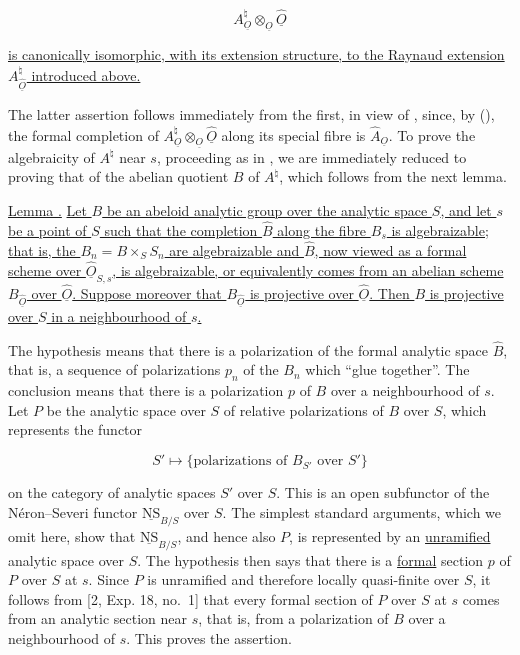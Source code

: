 \begin{equation*}
 A^{\natural}_{\underline O}\otimes_{\underline O}
 \hat{\underline O}
\end{equation*}

\noindent
\underline{is canonically isomorphic, with its extension structure, to
the Raynaud extension $A^{\natural}_{\hat{\underline O}}$ introduced
above.}

The latter assertion follows immediately from the first, in view of
, since, by (), the formal completion of
$A^{\natural}_{\underline O}\otimes_{\underline O}\hat{\underline O}$
along its special fibre is $\hat A_{\underline O}$.  To prove the
algebraicity of $A^{\natural}$ near $s$, proceeding as in , we are
immediately reduced to proving that of the abelian quotient $B$ of
$A^{\natural}$, which follows from the next lemma.

\medskip
\noindent
\underline{Lemma .} \underline{Let $B$ be an abeloid analytic
group over the analytic space $S$, and let $s$ be a point of $S$ such
that the completion $\hat B$ along the fibre $B_s$ is algebraizable;
that is, the $B_n=B\times_S S_n$ are algebraizable and $\hat B$, now
viewed as a formal scheme over $\hat{\underline O}_{S,s}$, is
algebraizable, or equivalently comes from an abelian scheme
$B_{\hat{\underline O}}$ over $\hat{\underline O}$.  Suppose moreover
that $B_{\hat{\underline O}}$ is projective over
$\hat{\underline O}$.  Then $B$ is projective over $S$ in a
neighbourhood of $s$.}

The hypothesis means that there is a polarization of the formal
analytic space $\hat B$, that is, a sequence of polarizations $p_n$ of
the $B_n$ which ``glue together''.  The conclusion means that there is
a polarization $p$ of $B$ over a neighbourhood of $s$.  Let $P$ be the
analytic space over $S$ of relative polarizations of $B$ over $S$,
which represents the functor

\begin{equation*}
 S'\longmapsto
 \{\text{polarizations of $B_{S'}$ over $S'$}\}
\end{equation*}

\noindent
on the category of analytic spaces $S'$ over $S$.  This is an open
subfunctor of the N\'eron--Severi functor $\underline{\mathrm{NS}}_{B/S}$
over $S$.  The simplest standard arguments, which we omit here, show
that $\underline{\mathrm{NS}}_{B/S}$, and hence also $P$, is represented
by an \underline{unramified} analytic space over $S$.  The hypothesis
then says that there is a \underline{formal} section $p$ of $P$ over
$S$ at $s$.  Since $P$ is unramified and therefore locally quasi-finite
over $S$, it follows from [2, Exp. 18, no.~1] that every formal section
of $P$ over $S$ at $s$ comes from an analytic section near $s$, that is,
from a polarization of $B$ over a neighbourhood of $s$.  This proves
the assertion.

